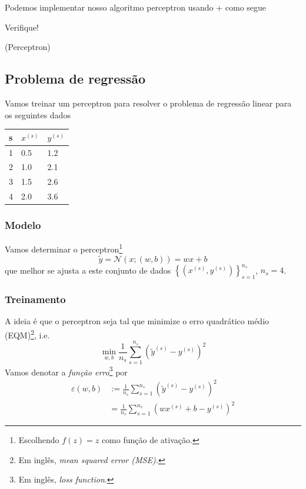 \ifispython
Podemos implementar nosso algoritmo perceptron usando {\python}+{\pytorch} como segue



Verifique!
\fi

\begin{teo}(Perceptron)
  \emconstrucao
\end{teo}

\subsection{Problema de regressão}

Vamos treinar um perceptron para resolver o problema de regressão linear para os seguintes dados

\begin{center}
  \begin{tabular}{l|ll}
    s & $x^{(s)}$ & $y^{(s)}$\\\hline
    1 & 0.5 & 1.2\\
    2 & 1.0 & 2.1\\
    3 & 1.5 & 2.6\\
    4 & 2.0 & 3.6\\\hline
  \end{tabular}
\end{center}

\subsubsection{Modelo}

Vamos determinar o perceptron\footnote{Escolhendo $f(z)=z$ como função de ativação.}
\begin{equation}\label{eq:percep_regr}
  \tilde{y} = \mathcal{N}(x; (w, b)) = wx + b
\end{equation}
que melhor se ajusta a este conjunto de dados $\left\{(x^{(s)}, y^{(s)})\right\}_{s=1}^{n_s}$, $n_s=4$.

\subsubsection{Treinamento}

A ideia é que o perceptron seja tal que minimize o erro quadrático médio (EQM)\footnote{Em inglês, \it{mean squared error} (MSE).}, i.e.
\begin{equation}\label{eq_percep:regr_prob}
  \min_{w,b}\frac{1}{n_s}\sum_{s=1}^{n_s}\left(\tilde{y}^{(s)}-y^{(s)}\right)^2
\end{equation}
Vamos denotar a \emph{função erro}\footnote{Em inglês, {\it loss function}.} por
\begin{align}\label{eq:eqm}
  \varepsilon(w,b) &:= \frac{1}{n_s}\sum_{s=1}^{n_s}\left(\tilde{y}^{(s)}-y^{(s)}\right)^2\\
                   &= \frac{1}{n_s}\sum_{s=1}^{n_s}\left(wx^{(s)}+b-y^{(s)}\right)^2
\end{align}

